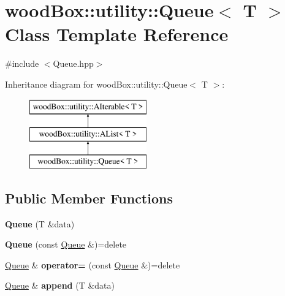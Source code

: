 \hypertarget{classwood_box_1_1utility_1_1_queue}{}\section{wood\+Box\+:\+:utility\+:\+:Queue$<$ T $>$ Class Template Reference}
\label{classwood_box_1_1utility_1_1_queue}


{\ttfamily \#include $<$Queue.\+hpp$>$}

Inheritance diagram for wood\+Box\+:\+:utility\+:\+:Queue$<$ T $>$\+:\begin{figure}[H]
\begin{center}
\leavevmode
\includegraphics[height=3.000000cm]{classwood_box_1_1utility_1_1_queue}
\end{center}
\end{figure}
\subsection*{Public Member Functions}
\begin{DoxyCompactItemize}
\item 
\mbox{\label{classwood_box_1_1utility_1_1_queue_a3fd68bd9b7d12606445926b4e26e763c}} 
{\bfseries Queue} (T \&data)
\item 
\mbox{\label{classwood_box_1_1utility_1_1_queue_a811d00da7a7cefd7e3551a1381396a96}} 
{\bfseries Queue} (const \mbox{\hyperlink{classwood_box_1_1utility_1_1_queue}{Queue}} \&)=delete
\item 
\mbox{\label{classwood_box_1_1utility_1_1_queue_a2c9fea4bcd5ee866d5d81b80a4ff6c6d}} 
\mbox{\hyperlink{classwood_box_1_1utility_1_1_queue}{Queue}} \& {\bfseries operator=} (const \mbox{\hyperlink{classwood_box_1_1utility_1_1_queue}{Queue}} \&)=delete
\item 
\mbox{\label{classwood_box_1_1utility_1_1_queue_a027d2b2c9fe678f913ddaf462b37669c}} 
\mbox{\hyperlink{classwood_box_1_1utility_1_1_queue}{Queue}} \& {\bfseries append} (T \&data)
\end{DoxyCompactItemize}
